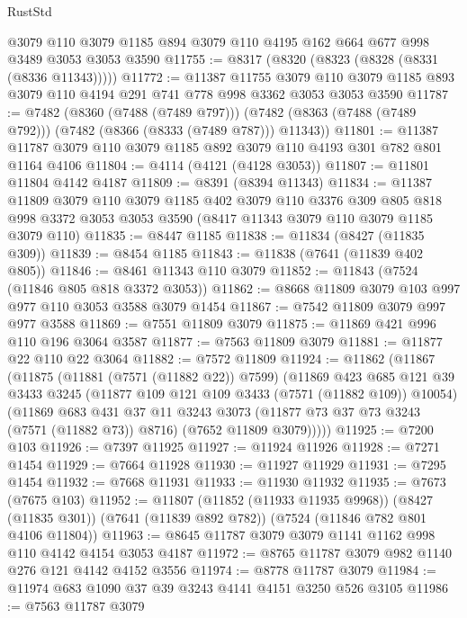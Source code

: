 \begin{lexlean}{RustStd}
\begin{coremodule}
    @3079
    @110
    @3079
    @1185
    @894
    @3079
    @110
    @4195
    @162
    @664
    @677
    @998
    @3489
    @3053
    @3053
    @3590
@11755 := @8317 (@8320 (@8323 (@8328 (@8331 (@8336 @11343)))))
@11772 := @11387
    @11755
    @3079
    @110
    @3079
    @1185
    @893
    @3079
    @110
    @4194
    @291
    @741
    @778
    @998
    @3362
    @3053
    @3053
    @3590
@11787 := @7482
    (@8360 (@7488 (@7489 @797)))
    (@7482 (@8363 (@7488 (@7489 @792))) (@7482 (@8366 (@8333 (@7489 @787))) @11343))
@11801 := @11387 @11787 @3079 @110 @3079 @1185 @892 @3079 @110 @4193 @301 @782 @801 @1164 @4106
@11804 := @4114 (@4121 (@4128 @3053))
@11807 := @11801 @11804 @4142 @4187
@11809 := @8391 (@8394 @11343)
@11834 := @11387
    @11809
    @3079
    @110
    @3079
    @1185
    @402
    @3079
    @110
    @3376
    @309
    @805
    @818
    @998
    @3372
    @3053
    @3053
    @3590
    (@8417 @11343 @3079 @110 @3079 @1185 @3079 @110)
@11835 := @8447 @1185
@11838 := @11834 (@8427 (@11835 @309))
@11839 := @8454 @1185
@11843 := @11838 (@7641 (@11839 @402 @805))
@11846 := @8461 @11343 @110 @3079
@11852 := @11843 (@7524 (@11846 @805 @818 @3372 @3053))
@11862 := @8668 @11809 @3079 @103 @997 @977 @110 @3053 @3588 @3079 @1454
@11867 := @7542 @11809 @3079 @997 @977 @3588
@11869 := @7551 @11809 @3079
@11875 := @11869 @421 @996 @110 @196 @3064 @3587
@11877 := @7563 @11809 @3079
@11881 := @11877 @22 @110 @22 @3064
@11882 := @7572 @11809
@11924 := @11862
    (@11867
      (@11875
        (@11881 (@7571 (@11882 @22)) @7599)
        (@11869
          @423
          @685
          @121
          @39
          @3433
          @3245
          (@11877 @109 @121 @109 @3433 (@7571 (@11882 @109)) @10054)
          (@11869
            @683
            @431
            @37
            @11
            @3243
            @3073
            (@11877 @73 @37 @73 @3243 (@7571 (@11882 @73)) @8716)
            (@7652 @11809 @3079)))))
@11925 := @7200 @103
@11926 := @7397 @11925
@11927 := @11924 @11926
@11928 := @7271 @1454
@11929 := @7664 @11928
@11930 := @11927 @11929
@11931 := @7295 @1454
@11932 := @7668 @11931
@11933 := @11930 @11932
@11935 := @7673 (@7675 @103)
@11952 := @11807
    (@11852 (@11933 @11935 @9968))
    (@8427 (@11835 @301))
    (@7641 (@11839 @892 @782))
    (@7524 (@11846 @782 @801 @4106 @11804))
@11963 := @8645 @11787 @3079 @3079 @1141 @1162 @998 @110 @4142 @4154 @3053 @4187
@11972 := @8765 @11787 @3079 @982 @1140 @276 @121 @4142 @4152 @3556
@11974 := @8778 @11787 @3079
@11984 := @11974 @683 @1090 @37 @39 @3243 @4141 @4151 @3250 @526 @3105
@11986 := @7563 @11787 @3079

\end{coremodule}
\end{lexlean}
